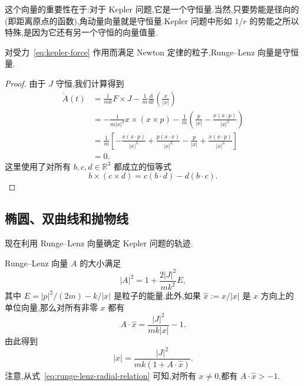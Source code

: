 这个向量的重要性在于:对于 Kepler 问题,它是一个守恒量.当然,只要势能是径向的(即距离原点的函数),角动量向量就是守恒量.Kepler 问题中形如 $1/r$ 的势能之所以特殊,是因为它还有另一个守恒的向量值量.

\begin{proposition}\label{pro:runge-lenz-conservation}
对受力~\eqref{eq:kepler-force} 作用而满足 Newton 定律的粒子,Runge--Lenz 向量是守恒量.
\end{proposition}

\begin{proof}
由于 $J$ 守恒,我们计算得到
\begin{align*}
\dot{A}(t)
 &=\frac{1}{mk}F\times J-\frac{1}{m}\frac{\mathrm{d}}{\mathrm{d}t}\left(\frac{x}{\lvert x\rvert}\right)\\
 &=-\frac{1}{m\lvert x\rvert^{3}}x\times(x\times p)-\frac{1}{m}\left(\frac{p}{\lvert x\rvert}-\frac{x(x\cdot p)}{\lvert x\rvert^{3}}\right)\\
 &=\frac1m\left[-\frac{x(x\cdot p)}{\lvert x\rvert^{3}}+\frac{p(x\cdot x)}{\lvert x\rvert^{3}}-\frac{p}{\lvert x\rvert}+\frac{x(x\cdot p)}{\lvert x\rvert^{3}}\right]\\
 &=0.
\end{align*}
这里使用了对所有 $b,c,d\in\mathbb{R}^{3}$ 都成立的恒等式
\[
  b\times(c\times d)=c(b\cdot d)-d(b\cdot c).
\]
\end{proof}

\subsection{椭圆、双曲线和抛物线}

现在利用 Runge--Lenz 向量确定 Kepler 问题的轨迹.

\begin{proposition}\label{pro:runge-lenz-magnitude}
Runge--Lenz 向量 $A$ 的大小满足
\begin{equation}
  \lvert A\rvert^{2}=1+\frac{2\lvert J\rvert^{2}}{mk^{2}}E,
  \label{eq:runge-lenz-magnitude}
\end{equation}
其中 $E=\lvert p\rvert^{2}/(2m)-k/\lvert x\rvert$ 是粒子的能量.此外,如果 $\widehat{x}:=x/\lvert x\rvert$ 是 $x$ 方向上的单位向量,那么对所有非零 $x$ 都有
\begin{equation}
  A\cdot\widehat{x}=\frac{\lvert J\rvert^{2}}{mk\lvert x\rvert}-1.
  \label{eq:runge-lenz-radial-relation}
\end{equation}
由此得到
\begin{equation}
  \lvert x\rvert=\frac{\lvert J\rvert^{2}}{mk(1+A\cdot\widehat{x})}.
  \label{eq:kepler-radial-equation}
\end{equation}
注意,从式~\eqref{eq:runge-lenz-radial-relation} 可知,对所有 $x\neq0$,都有 $A\cdot\widehat{x}>-1$.
\end{proposition}

